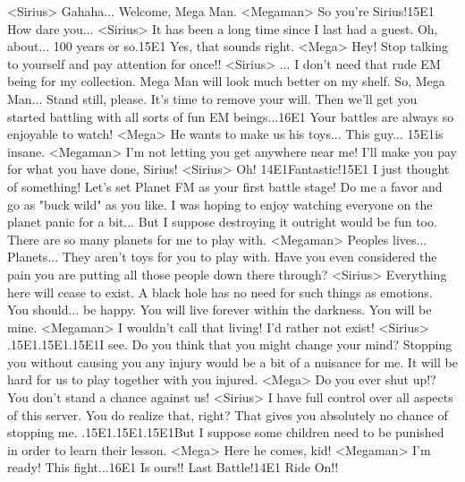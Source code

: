 <Sirius> Gahaha... 
Welcome, Mega Man. 
<Megaman> So you're Sirius!{15}{E1} How dare you... 
<Sirius> It has been a long time since I last had a guest. 
Oh, about... 100 years or so.{15}{E1} Yes, that sounds right. 
<Mega> Hey! Stop talking to yourself and pay attention for once!! 
<Sirius> ... 
I don't need that rude EM being for my collection. 
Mega Man will look much better on my shelf. 
So, Mega Man... Stand still, please. It's time to remove your will. 
Then we'll get you started battling with all sorts of fun EM beings...{16}{E1} 
Your battles are always so enjoyable to watch! 
<Mega> He wants to make us his toys... 
This guy... {15}{E1}is insane. 
<Megaman> I'm not letting you get anywhere near me! 
I'll make you pay for what you have done, Sirius! 
<Sirius> Oh! {14}{E1}Fantastic!{15}{E1} I just thought of something! 
Let's set Planet FM as your first battle stage! 
Do me a favor and go as "buck wild" as you like. 
I was hoping to enjoy watching everyone on the planet panic for a bit... 
But I suppose destroying it outright would be fun too. 
There are so many planets for me to play with. 
<Megaman> Peoples lives... Planets... They aren't toys for you to play with. 
Have you even considered the pain you are putting all 
those people down there through? 
<Sirius> Everything here will cease to exist. 
A black hole has no need for such things as emotions. 
You should... be happy. 
You will live forever within the darkness. 
You will be mine. 
<Megaman> I wouldn't call that living! 
I'd rather not exist! 
<Sirius> .{15}{E1}.{15}{E1}.{15}{E1}I see. Do you think that you might change your mind? 
Stopping you without causing you any injury would be a bit of a nuisance for me. 
It will be hard for us to play together with you injured. 
<Mega> Do you ever shut up!? You don't stand a chance against us! 
<Sirius> I have full control over all aspects of this server. 
You do realize that, right? 
That gives you absolutely no chance of stopping me. 
.{15}{E1}.{15}{E1}.{15}{E1}But I suppose some children need to be punished in order to learn their lesson. 
<Mega> Here he comes, kid! 
<Megaman> I'm ready! This fight...{16}{E1} Is ours!! 
Last Battle!{14}{E1} Ride On!! 
